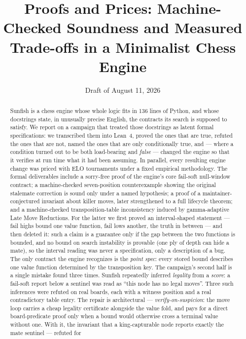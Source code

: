 \documentclass[11pt]{article}
\title{Proofs and Prices: Machine-Checked Soundness and Measured
  Trade-offs in a Minimalist Chess Engine}
\author{\AuthorOne{} \and \AuthorTwo}%
\date{Draft of August 11, 2026}
\theoremstyle{plain}
\theoremstyle{definition}
\theoremstyle{remark}
\begin{document}
\maketitle

\begin{abstract}
Sunfish is a chess engine whose whole logic fits in 136 lines of Python,
and whose docstrings state, in unusually precise English, the contracts
its search is supposed to satisfy.  We report on a campaign that
treated those docstrings as latent formal specifications: we transcribed
them into Lean~4, proved the ones that are true, refuted the ones that
are not, named the ones that are only conditionally true, and --- where
a condition turned out to be both load-bearing and \emph{false} ---
changed the engine so that it verifies at run time what it had been
assuming.  In parallel, every resulting engine change was priced with
ELO tournaments under a fixed empirical methodology.
The formal deliverables include a sorry-free proof of the engine's core
fail-soft null-window contract; a machine-checked seven-position
counterexample showing the original stalemate correction is sound only
under a named hypothesis; a proof of a maintainer-conjectured invariant
about killer moves, later strengthened to a full lifecycle theorem; and
a machine-checked transposition-table inconsistency induced by
gamma-adaptive Late Move Reductions.  For the latter we first proved an
interval-shaped statement --- fail highs bound one value function, fail
lows another, the truth in between --- and then deleted it: such a
claim is a guarantee only if the gap between the two functions is
bounded, and no bound on search instability is provable (one ply of
depth can hide a mate), so the interval reading was never a
specification, only a description of a bug.  The only contract the
engine recognizes is the \emph{point spec}: every stored bound
describes one value function determined by the transposition key.
The campaign's second half is a single mistake found three times.
Sunfish repeatedly inferred \emph{legality} from a \emph{score}: a
fail-soft report below a sentinel was read as ``this node has no legal
moves''.  Three such inferences were refuted on real boards, each with
a witness position and a real contradictory table entry.  The repair is
architectural --- \emph{verify-on-suspicion}: the move loop carries a
cheap legality certificate alongside the value fold, and pays for a
direct board-predicate proof only when a bound would otherwise cross a
terminal value without one.  With it, the invariant that a
king-capturable node reports exactly the mate sentinel --- refuted for

\end{abstract}
\end{document}
